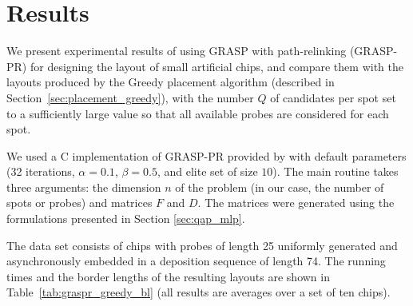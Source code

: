 \section{Results}
\label{sec:qap_results}

We present experimental results of using GRASP with path-relinking (GRASP-PR)
for designing the layout of small artificial chips, and compare them with the
layouts produced by the Greedy placement algorithm (described in
Section~\ref{sec:placement_greedy}), with the number $Q$ of candidates per spot
set to a sufficiently large value so that all available probes are considered
for each spot.

We used a C implementation of GRASP-PR provided by \citet{Oliveira2003} with
default parameters (32 iterations, $\alpha=0.1$, $\beta=0.5$, and elite set of
size $10$). The main routine takes three arguments: the dimension $n$ of the
problem (in our case, the number of spots or probes) and matrices $F$ and $D$.
The matrices were generated using the formulations presented in Section
\ref{sec:qap_mlp}.

The data set consists of chips with probes of length 25 uniformly generated and
asynchronously embedded in a deposition sequence of length 74. The running times
and the border lengths of the resulting layouts are shown in
Table~\ref{tab:graspr_greedy_bl} (all results are averages over a set of ten
chips).


